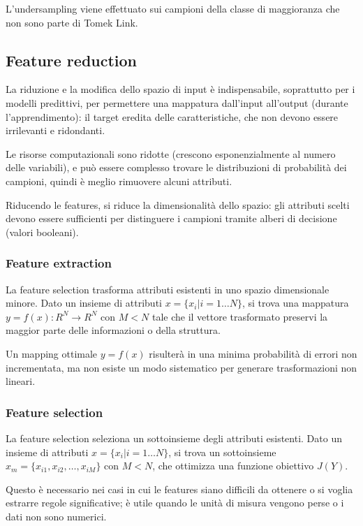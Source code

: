L'undersampling viene effettuato sui campioni della classe di maggioranza che non sono parte di Tomek Link. 

\subsection{Feature reduction}
La riduzione e la modifica dello spazio di input è indispensabile, soprattutto per i modelli predittivi, per permettere una mappatura dall'input all'output (durante l'apprendimento): il target eredita delle caratteristiche, che non devono essere irrilevanti e ridondanti.

Le risorse computazionali sono ridotte (crescono esponenzialmente al numero delle variabili), e può essere complesso trovare le distribuzioni di probabilità dei campioni, quindi è meglio rimuovere alcuni attributi.

Riducendo le features, si riduce la dimensionalità dello spazio: gli attributi scelti devono essere sufficienti per distinguere i campioni tramite alberi di decisione (valori booleani). 

\subsubsection{Feature extraction}
La feature selection trasforma attributi esistenti in uno spazio dimensionale minore. Dato un insieme di attributi $x = \{x_i | i = 1 \dots N\}$, si trova una mappatura $y = f(x) : R^N \rightarrow R^N$ con $M < N$ tale che il vettore trasformato preservi la maggior parte delle informazioni o della struttura.

Un mapping ottimale $y = f(x)$ risulterà in una minima probabilità di errori non incrementata, ma non esiste un modo sistematico per generare trasformazioni non lineari. 

\subsubsection{Feature selection}
La feature selection seleziona un sottoinsieme degli attributi esistenti. Dato un insieme di attributi $x = \{x_i | i = 1 \dots N\}$, si trova un sottoinsieme $x_m = \{x_{i1}, x_{i2}, \dots, x_{iM}\}$ con $M < N$, che ottimizza una funzione obiettivo $J(Y)$.

Questo è necessario nei casi in cui le features siano difficili da ottenere o si voglia estrarre regole significative; è utile quando le unità di misura vengono perse o i dati non sono numerici.

